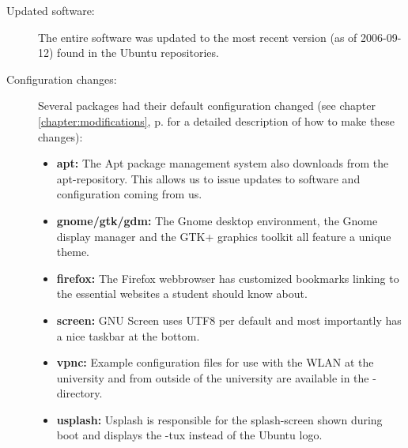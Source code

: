 \begin{description}
\begin{itemize}
     \end{itemize}
   \item[Updated software:] The entire software was updated to the most recent
     version (as of 2006-09-12) found in the Ubuntu repositories. 
   \item[Configuration changes:] Several packages had their default
     configuration changed (see chapter \ref{chapter:modifications}, p. 
     	\pageref{chapter:modifications} for a detailed description of how to make
	these changes):
     \begin{itemize}
       \item \textbf{apt:} The Apt package management system also downloads from
         the \tunix apt-repository. This allows us to issue updates to software
	 and configuration coming from us.
       \item \textbf{gnome/gtk/gdm:} The Gnome desktop environment, the Gnome
         display manager and the GTK+ graphics toolkit all feature a unique
	 theme.
       \item \textbf{firefox:} The Firefox webbrowser has customized bookmarks
         linking to the essential websites a student should know about.
       \item \textbf{screen:} GNU Screen uses UTF8 per default and most
         importantly has a nice taskbar at the bottom.
       \item \textbf{vpnc:} Example configuration files for use with the WLAN at
         the university and from outside of the university are available in the
	 -directory.
       \item \textbf{usplash:} Usplash is responsible for the splash-screen
         shown during boot and displays the \tunix-tux instead of the Ubuntu
	 logo.
     \end{itemize}
\end{description}
